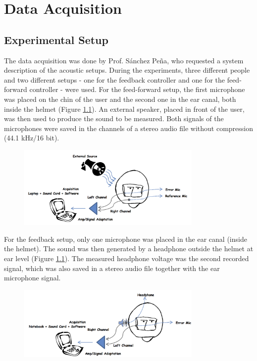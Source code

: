 \chapter{Data Acquisition}
\section{Experimental Setup}
The data acquisition was done by Prof. S\'{a}nchez Pe\~{n}a, who requested a system description of the acoustic setups. During the experiments, three different people and two different setups - one for the feedback controller and one for the feed-forward controller - were used. For the feed-forward setup, the first microphone was placed on the chin of the user and the second one in the ear canal, both inside the helmet (Figure \ref{}). An external speaker, placed in front of the user, was then used to produce the sound to be measured. Both signals of the microphones were saved in the channels of a stereo audio file without compression (44.1 kHz/16 bit).\\

\begin{figure}[h]
\centering
\includegraphics[width=0.8\textwidth]{pics/setupff}
\caption{}
\label{pic:}
\end{figure}

For the feedback setup, only one microphone was placed in the ear canal (inside the helmet). The sound was then generated by a headphone outside the helmet at ear level (Figure \ref{}). The measured headphone voltage was the second recorded signal, which was also saved in a stereo audio file together with the ear microphone signal.

\begin{figure}[h]
\centering
\includegraphics[width=0.8\textwidth]{pics/setupfb}
\caption{}
\label{pic:}
\end{figure}

